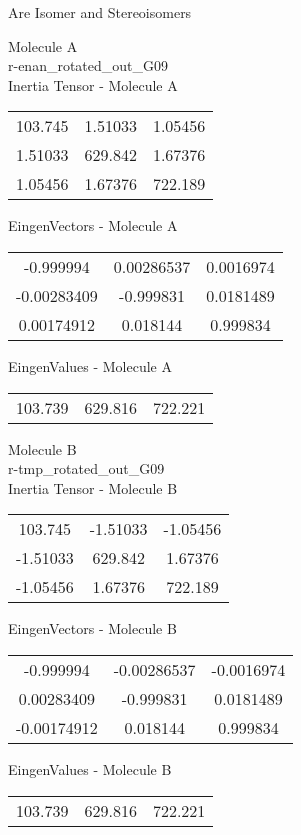 \begin{center}
\vtab
\vtab
\textcolor{NavyBlue}{\Large Are Isomer and Stereoisomers}
\end{center}
\newpage
\begin{multicols}{2}
\begin{center}
Molecule A \\ 
r-enan\_rotated\_out\_G09
\\
Inertia Tensor - Molecule A \\
\vtab
\begin{tabular}{|c c c|}
103.745	 & 	1.51033	 & 	1.05456	 \\
1.51033	 & 	629.842	 & 	1.67376	 \\
1.05456	 & 	1.67376	 & 	722.189
\end{tabular}

\vtab
 EingenVectors - Molecule A     \\
\vtab
\begin{tabular}{|c c c|}
-0.999994	 & 	0.00286537	 & 	0.0016974	 \\
-0.00283409	 & 	-0.999831	 & 	0.0181489	 \\
0.00174912	 & 	0.018144	 & 	0.999834
\end{tabular}

\vtab
 EingenValues - Molecule A     \\
\vtab
\begin{tabular}{|c c c|}
103.739	 & 	629.816	 & 	722.221
\end{tabular}
\columnbreak

Molecule B \\ 
r-tmp\_rotated\_out\_G09
\\
Inertia Tensor - Molecule B \\
\vtab
\begin{tabular}{|c c c|}
103.745	 & 	-1.51033	 & 	-1.05456	 \\
-1.51033	 & 	629.842	 & 	1.67376	 \\
-1.05456	 & 	1.67376	 & 	722.189
\end{tabular}

\vtab
 EingenVectors - Molecule B     \\
\vtab
\begin{tabular}{|c c c|}
-0.999994	 & 	-0.00286537	 & 	-0.0016974	 \\
0.00283409	 & 	-0.999831	 & 	0.0181489	 \\
-0.00174912	 & 	0.018144	 & 	0.999834
\end{tabular}

\vtab
 EingenValues - Molecule B     \\
\vtab
\begin{tabular}{|c c c|}
103.739	 & 	629.816	 & 	722.221
\end{tabular}

\end{center}
\end{multicols}
